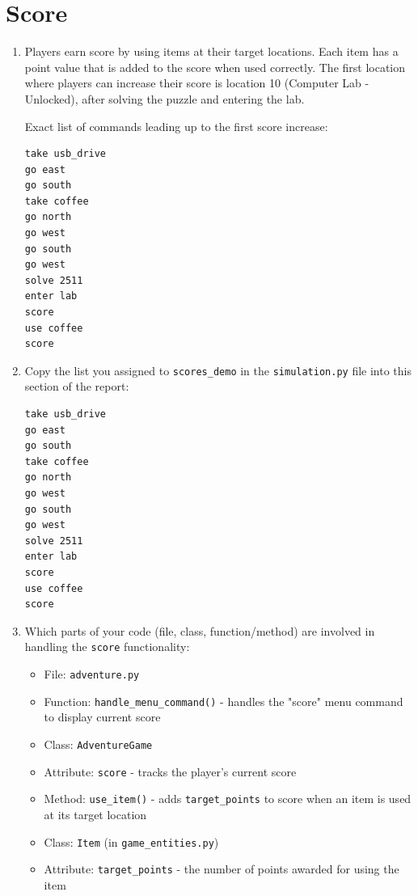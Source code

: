 \documentclass[11pt]{article}
\begin{document}
\section*{Score}
\begin{enumerate}

    \item Players earn score by using items at their target locations. Each item has a point value that is added to the score when used correctly. The first location where players can increase their score is location 10 (Computer Lab - Unlocked), after solving the puzzle and entering the lab.

    Exact list of commands leading up to the first score increase:
    \begin{verbatim}
take usb_drive
go east
go south
take coffee
go north
go west
go south
go west
solve 2511
enter lab
score
use coffee
score
    \end{verbatim}

    \item Copy the list you assigned to \texttt{scores\_demo} in the \texttt{simulation.py} file into this section of the report:
    \begin{verbatim}
take usb_drive
go east
go south
take coffee
go north
go west
go south
go west
solve 2511
enter lab
score
use coffee
score
    \end{verbatim}

    \item Which parts of your code (file, class, function/method) are involved in handling the \texttt{score} functionality:
    \begin{itemize}
        \item File: \texttt{adventure.py}
        \item Function: \texttt{handle\_menu\_command()} - handles the "score" menu command to display current score
        \item Class: \texttt{AdventureGame}
        \item Attribute: \texttt{score} - tracks the player's current score
        \item Method: \texttt{use\_item()} - adds \texttt{target\_points} to score when an item is used at its target location
        \item Class: \texttt{Item} (in \texttt{game\_entities.py})
        \item Attribute: \texttt{target\_points} - the number of points awarded for using the item
    \end{itemize}
\end{enumerate}
\end{document}
